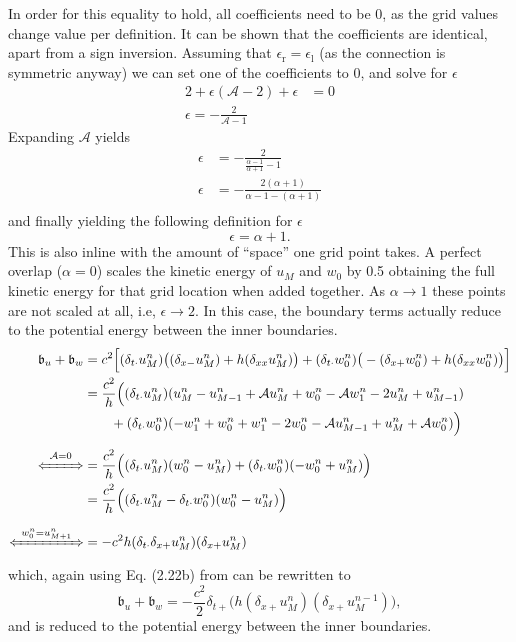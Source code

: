 \documentclass[dvipsnames]{article}
\def\mystrut{\rule[-.2\baselineskip]{0pt}{\baselineskip}}
\def\Iterm{\mathcal{A}}
\begin{document}
In order for this equality to hold, all coefficients need to be 0, as the grid values change value per definition. It can be shown that the coefficients are identical, apart from a sign inversion. Assuming that $\epsilon_\text{r} = \epsilon_\text{l}$ (as the connection is symmetric anyway) we can set one of the coefficients to 0, and solve for $\epsilon$ 
\begin{align*}
    2 + \epsilon(\Iterm-2) + \epsilon &= 0\\
    \epsilon = - \frac{2}{\Iterm - 1}
\end{align*}
Expanding $\Iterm$ yields
\begin{align*}
    \epsilon &= -\frac{2}{\frac{\alpha - 1}{\alpha + 1} - 1}\\
    \epsilon &= -\frac{2(\alpha + 1)}{\alpha - 1 - (\alpha + 1)}\\
\end{align*}
and finally yielding the following definition for $\epsilon$
\begin{equation}
    \epsilon = \alpha + 1.
\end{equation}
This is also inline with the amount of ``space'' one grid point takes. A perfect overlap ($\alpha = 0$) scales the kinetic energy of $u_M$ and $w_0$ by 0.5 obtaining the full kinetic energy for that grid location when added together. As $\alpha \rightarrow 1$ these points are not scaled at all, i.e, $\epsilon \rightarrow 2$. In this case, the boundary terms actually reduce to the potential energy between the inner boundaries. 
\begin{align*}
    \mathfrak{b}_u + \mathfrak{b}_w &=c^2\Big[(\delta_{t\cdot}u_M^n)\big((\delta_{x-}u_M^n)+h(\delta_{xx}u_M^n)\big)+(\delta_{t\cdot}w_0^n)\big(-(\delta_{x+}w_0^n)+h(\delta_{xx}w_0^n)\big)\Big]
    \\
    &= \frac{c^2}{h}\Big((\delta_{t\cdot}u_M^n)(u_M^n - u_{M-1}^n + \Iterm u_M^n + w_0^n - \Iterm w_1^n - 2u_M^n + u_{M-1}^n) \\
    &\qquad+ (\delta_{t\cdot}w_0^n)(-w_1^n+w_0^n + w_1^n-2w_0^n-\Iterm u_{M-1}^n + u_M^n + \Iterm w_0^n)\Big)\\
    \xLeftrightarrow{\mystrut\ \Iterm = 0\ } &= \frac{c^2}{h}\Big((\delta_{t\cdot}u_M^n)(w_0^n - u_M^n )+ (\delta_{t\cdot}w_0^n)(-w_0^n+ u_M^n)\Big)\\
    &= \frac{c^2}{h}\Big((\delta_{t\cdot}u_M^n - \delta_{t\cdot}w_0^n)(w_0^n - u_M^n)\Big)\\
    \xLeftrightarrow{\mystrut\ w_0^n = u_{M+1}^n\ }&= -c^2h(\delta_{t\cdot}\delta_{x+}u_M^n)(\delta_{x+}u_M^n)
\end{align*}
which, again using Eq. (2.22b) from \cite{Bilbao2009} can be rewritten to
\begin{equation}
    \mathfrak{b}_u+\mathfrak{b}_w = -\frac{c^2}{2}\delta_{t+}\big(h(\delta_{x+}u_M^n)(\delta_{x+}u_M^{n-1})\big),  
\end{equation}
and is reduced to the potential energy between the inner boundaries. 
\end{document}
